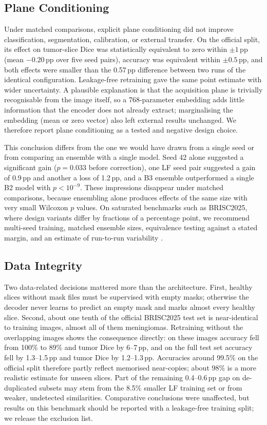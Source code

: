 \documentclass[journal]{IEEEtran}
\begin{document}
\subsection{Plane Conditioning}
Under matched comparisons, explicit plane conditioning did not improve classification, segmentation, calibration, or external transfer. On the official split, its effect on tumor-slice Dice was statistically equivalent to zero within $\pm1$\,pp (mean $-0.20$\,pp over five seed pairs), accuracy was equivalent within $\pm0.5$\,pp, and both effects were smaller than the 0.57\,pp difference between two runs of the identical configuration. Leakage-free retraining gave the same point estimate with wider uncertainty. A plausible explanation is that the acquisition plane is trivially recognisable from the image itself, so a 768-parameter embedding adds little information that the encoder does not already extract; marginalising the embedding (mean or zero vector) also left external results unchanged. We therefore report plane conditioning as a tested and negative design choice.

This conclusion differs from the one we would have drawn from a single seed or from comparing an ensemble with a single model. Seed 42 alone suggested a significant gain ($p=0.033$ before correction), one LF seed pair suggested a gain of 0.9\,pp and another a loss of 1.2\,pp, and a B3 ensemble outperformed a single B2 model with $p<10^{-9}$. These impressions disappear under matched comparisons, because ensembling alone produces effects of the same size with very small Wilcoxon $p$ values. On saturated benchmarks such as BRISC2025, where design variants differ by fractions of a percentage point, we recommend multi-seed training, matched ensemble sizes, equivalence testing against a stated margin, and an estimate of run-to-run variability \cite{bouthillier2021accounting}.

\subsection{Data Integrity}
Two data-related decisions mattered more than the architecture. First, healthy slices without mask files must be supervised with empty masks; otherwise the decoder never learns to predict an empty mask and marks almost every healthy slice. Second, about one tenth of the official BRISC2025 test set is near-identical to training images, almost all of them meningiomas. Retraining without the overlapping images shows the consequence directly: on these images accuracy fell from 100\% to 89\% and tumor Dice by 6--7\,pp, and on the full test set accuracy fell by 1.3--1.5\,pp and tumor Dice by 1.2--1.3\,pp. Accuracies around 99.5\% on the official split therefore partly reflect memorised near-copies; about 98\% is a more realistic estimate for unseen slices. Part of the remaining 0.4--0.6\,pp gap on de-duplicated subsets may stem from the 8.5\% smaller LF training set or from weaker, undetected similarities. Comparative conclusions were unaffected, but results on this benchmark should be reported with a leakage-free training split; we release the exclusion list.
\end{document}
